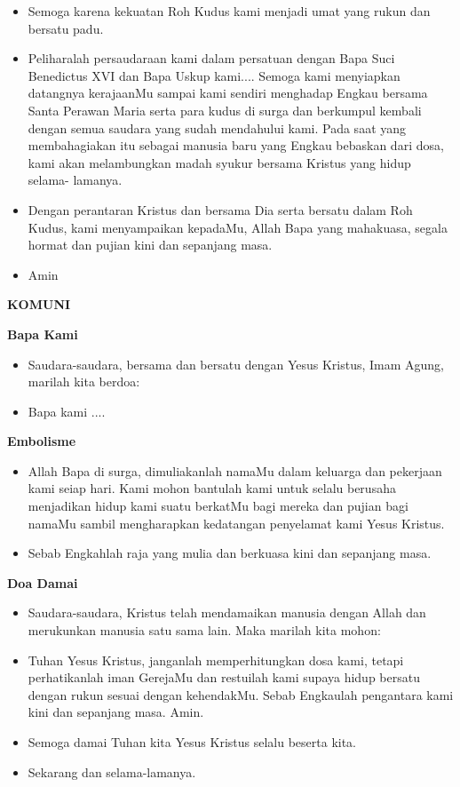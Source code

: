 \documentclass[a5paper,headsepline,titlepage,12pt,nnormalheadings,DIVcalc,twoside]{scrbook}
\makeatletter
\newcommand{\subjudul}[1]{%
  {\parindent \z@ 
    \interlinepenalty\@M \bfseries #1\par\nobreak \vskip 10\p@ }}
\newcommand{\BU}[1]{\begin{itemize} \item[U:] #1 \end{itemize}}
\newcommand{\BI}[1]{\begin{itemize} \item[I:] #1 \end{itemize}}
\newcommand{\BIU}[1]{\begin{itemize} \item[I+U:] #1 \end{itemize}}
\makeatother
\begin{document}
\BU{Semoga karena kekuatan Roh Kudus kami menjadi umat 
yang rukun dan bersatu padu.}

\BI{Peliharalah persaudaraan kami dalam persatuan dengan 
Bapa Suci Benedictus XVI dan Bapa Uskup kami.... Semoga 
kami menyiapkan datangnya kerajaanMu sampai kami 
sendiri menghadap Engkau bersama Santa Perawan Maria 
serta para kudus di surga dan berkumpul kembali dengan 
semua saudara yang sudah mendahului kami. Pada saat 
yang membahagiakan itu sebagai manusia baru yang 
Engkau bebaskan dari dosa, kami akan melambungkan 
madah syukur bersama Kristus yang hidup selama-
lamanya.}

\BIU{Dengan perantaran Kristus dan bersama Dia serta bersatu 
dalam Roh Kudus, kami menyampaikan kepadaMu, Allah 
Bapa yang mahakuasa, segala hormat dan pujian kini dan 
sepanjang masa.}

\BU{Amin}

 

\subjudul{KOMUNI}

 

\subjudul{Bapa Kami}

\BI{Saudara-saudara, bersama dan bersatu dengan Yesus 
Kristus, Imam Agung, marilah kita berdoa:}

\BU{Bapa kami ....}

 

\subjudul{Embolisme}

\BI{Allah Bapa di surga, dimuliakanlah namaMu dalam 
keluarga dan pekerjaan kami seiap hari. Kami mohon 
bantulah kami untuk selalu berusaha menjadikan hidup 
kami suatu berkatMu bagi mereka dan pujian bagi 
namaMu sambil mengharapkan kedatangan penyelamat 
kami Yesus Kristus.}

\BU{Sebab Engkahlah raja yang mulia dan berkuasa kini dan 
sepanjang masa.}

\subjudul{Doa Damai}

\BI{Saudara-saudara, Kristus telah mendamaikan manusia 
dengan Allah dan merukunkan manusia satu sama lain. 
Maka marilah kita mohon:}

\BU{Tuhan Yesus Kristus, janganlah memperhitungkan dosa 
kami, tetapi perhatikanlah iman GerejaMu dan restuilah 
kami supaya hidup bersatu dengan rukun sesuai dengan 
kehendakMu. Sebab Engkaulah pengantara kami kini dan 
sepanjang masa. Amin.}

\BI{Semoga damai Tuhan kita Yesus Kristus selalu beserta 
kita.}

\BU{Sekarang dan selama-lamanya.}

 
\end{document}
